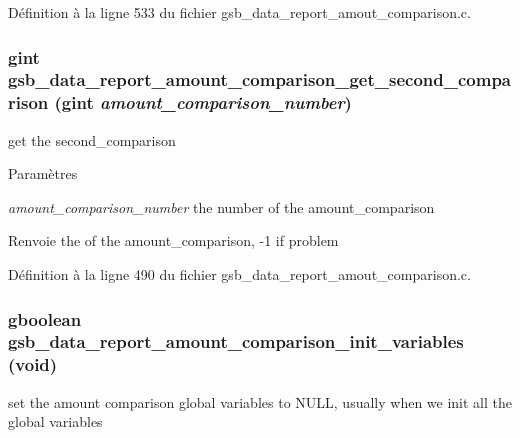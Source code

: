 Définition à la ligne 533 du fichier gsb\_\-data\_\-report\_\-amout\_\-comparison.c.

\subsubsection[{gsb\_\-data\_\-report\_\-amount\_\-comparison\_\-get\_\-second\_\-comparison}]{\setlength{\rightskip}{0pt plus 5cm}gint gsb\_\-data\_\-report\_\-amount\_\-comparison\_\-get\_\-second\_\-comparison (gint {\em amount\_\-comparison\_\-number})}\label{gsb__data__report__amout__comparison_8h_aa9d04fc293edeacf0930121bd663f234}
get the second\_\-comparison


\begin{DoxyParams}{Paramètres}
\item[{\em amount\_\-comparison\_\-number}]the number of the amount\_\-comparison\end{DoxyParams}
\begin{DoxyReturn}{Renvoie}
the of the amount\_\-comparison, -\/1 if problem 
\end{DoxyReturn}


Définition à la ligne 490 du fichier gsb\_\-data\_\-report\_\-amout\_\-comparison.c.

\subsubsection[{gsb\_\-data\_\-report\_\-amount\_\-comparison\_\-init\_\-variables}]{\setlength{\rightskip}{0pt plus 5cm}gboolean gsb\_\-data\_\-report\_\-amount\_\-comparison\_\-init\_\-variables (void)}\label{gsb__data__report__amout__comparison_8h_a4bc827b0163170e6bab3d4ea451fd10a}
set the amount comparison global variables to NULL, usually when we init all the global variables


